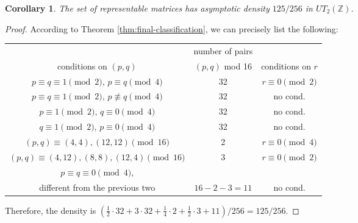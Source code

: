 \documentclass[11pt]{amsart}
\newtheorem{corollary}[theorem]{Corollary}
\def\Z{\mathbb{Z}}
\begin{document}
\begin{corollary}
    The set of representable matrices has asymptotic density $125/256$ in $UT_2(\Z)$.
\end{corollary}
\begin{proof}
    According to Theorem \ref{thm:final-classification}, we can precisely list the following: 
    \begin{center}
    \begin{tabular}{c|c|c}
        & number of pairs    &  \\ 
         conditions on $(p,q)$  & $(p,q)$ mod 16  &  conditions on $r$   \\\hline \hline
 $p\equiv q\equiv 1\pmod2$,    $p\equiv q\pmod4$     & 32  & $r\equiv 0\pmod 2$ \\ \hline 
      $p\equiv q\equiv 1\pmod2$,    $p\not\equiv q\pmod4$     & 32  & no cond. \\ \hline
        $p\equiv 1\pmod2$,    $q \equiv 0\pmod4$     & 32  & no cond. \\ \hline
         $q\equiv 1\pmod2$,    $p \equiv 0\pmod4$     & 32  & no cond. \\ \hline
          $(p,q)\equiv (4,4),(12,12)\pmod{16}$     & 2  & $r\equiv 0\pmod 4$ \\ \hline
           $(p,q)\equiv (4,12),(8,8),(12,4)\pmod{16}$     & 3  & $r\equiv 0\pmod 2$ \\ \hline
     $p\equiv q\equiv 0\pmod4$, & & \\    
     different from the previous two       & $16-2-3=11$  & no cond. \\  
    \end{tabular}     
    \end{center}
Therefore, the density is $(\frac{1}{2}\cdot 32+3\cdot 32+\frac{1}{4}\cdot 2+\frac{1}{2}\cdot 3+11)/256=125/256$.
\end{proof}
    
\end{document}
